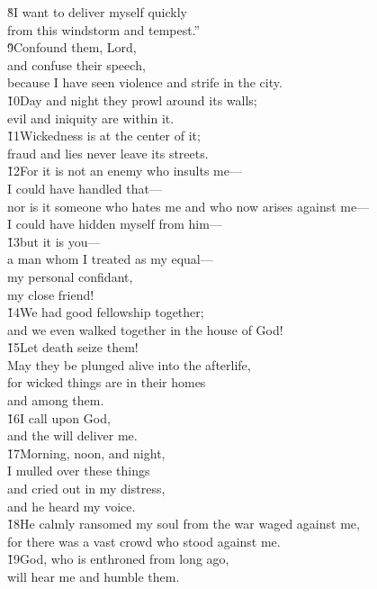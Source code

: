\begin{poetry}
\poeml \v{8}I want to deliver myself quickly \\
\poemll    from this windstorm and tempest.'' \\
\poeml \v{9}Confound them, Lord, \\
\poemll    and confuse their speech, \\
\poemlll       because I have seen violence and strife in the city. \\
\poeml \v{10}Day and night they prowl around its walls; \\
\poemll    evil and iniquity are within it. \\
\poeml \v{11}Wickedness is at the center of it; \\
\poemll    fraud and lies never leave its streets. \\
\poeml \v{12}For it is not an enemy who insults me--- \\
\poemll    I could have handled that--- \\
\poeml nor is it someone who hates me and who now arises against me--- \\
\poemll    I could have hidden myself from him--- \\
\poeml \v{13}but it is you--- \\
\poemll    a man whom I treated as my equal--- \\
\poeml my personal confidant, \\
\poemll    my close friend! \\
\poeml \v{14}We had good fellowship together; \\
\poemll    and we even walked together in the house of God! \\
\poeml \v{15}Let death seize them! \\
\poemll    May they be plunged alive into the afterlife, \\
\poeml for wicked things are in their homes \\
\poemll    and among them. \\
\poeml \v{16}I call upon God, \\
\poemll    and the  will deliver me. \\
\poeml \v{17}Morning, noon, and night, \\
\poemll    I mulled over these things \\
\poeml and cried out in my distress, \\
\poemll    and he heard my voice. \\
\poeml \v{18}He calmly ransomed my soul from the war waged against me, \\
\poemll    for there was a vast crowd who stood against me. \\
\poeml \v{19}God, who is enthroned from long ago, \\
\poemll    will hear me and humble them.
\end{poetry}

